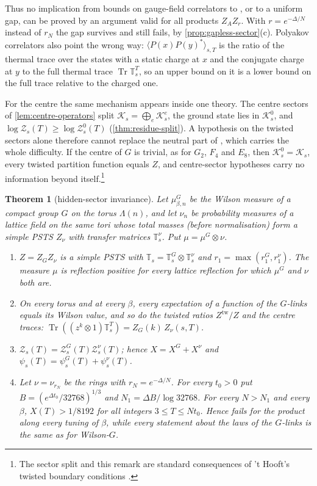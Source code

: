 \documentclass[11pt,a4paper]{amsart}
\newtheorem{theorem}{Theorem}[section]
\theoremstyle{definition}
\theoremstyle{remark}
\numberwithin{equation}{section}
\DeclareMathOperator{\Tr}{Tr}        %
\newcommand{\Kspace}{\mathcal{K}}    %
\newcommand{\PSTS}{\textup{PSTS}}          %
\newcommand{\TT}{\mathbb{T}}               %
\newcommand{\Zc}{\mathcal{Z}}              %
\newcommand{\Zs}[2]{\Zc_{#1}(#2)}          %
\newcommand{\psiT}[2]{\psi_{#1}(#2)}       %
\newcommand{\xconst}{\frac{1}{8192}}       %
\newcommand{\xconstinl}{1/8192}            %
\newcommand{\Mcirc}{\text{\upshape(M$^{\circ}$)}}   %
\newcommand{\Bcirc}{\text{\upshape(B$^{\circ}$)}}   %
\newcommand{\tzero}{t_0}                   %
\begin{document}
Thus no implication from bounds on gauge-field correlators to \Bcirc{}, or to a uniform gap, can be proved by an argument valid for all products $Z_AZ_r$. With $r=e^{-\Delta/N}$ instead of $r_N$ the gap survives and \Bcirc{} still fails, by \cref{prop:gapless-sector}(c). Polyakov correlators also point the wrong way: $\langle P(x)P(y)^*\rangle_{s,T}$ is the ratio of the thermal trace over the states with a static charge at $x$ and the conjugate charge at $y$ to the full thermal trace $\Tr\TT_s^T$, so an upper bound on it is a lower bound on the full trace relative to the charged one.

For the centre the same mechanism appears inside one theory. The centre sectors of \cref{lem:centre-operators} split $\Kspace_s=\bigoplus_e\Kspace^e_s$, the ground state lies in $\Kspace^0_s$, and $\log\Zs{s}{T}\ge\log\Zc^0_s(T)$ (\cref{thm:residue-split}). A hypothesis on the twisted sectors alone therefore cannot replace the neutral part of \Bcirc{}, which carries the whole difficulty. If the centre of $G$ is trivial, as for $G_2$, $F_4$ and $E_8$, then $\Kspace^0_s=\Kspace_s$, every twisted partition function equals $Z$, and centre-sector hypotheses carry no information beyond \Bcirc{} itself.\footnote{The sector split and this remark are standard consequences of 't Hooft's twisted boundary conditions \cite{thooft1979}.}

\begin{theorem}[hidden-sector invariance]\label{thm:hidden-sector}
Let $\mu^G_{\beta,n}$ be the Wilson measure of a compact group $G$ on the torus $\Lambda(n)$, and let $\nu_n$ be probability measures of a lattice field on the same tori whose total masses (before normalisation) form a simple \PSTS{} $Z_\nu$ with transfer matrices $\TT^\nu_s$. Put $\mu=\mu^G\otimes\nu$.
\begin{enumerate}[label=\textup{(\alph*)},leftmargin=*]
\item $Z=Z_GZ_\nu$ is a simple \PSTS{} with $\TT_s=\TT^G_s\otimes\TT^\nu_s$ and $r_1=\max(r^G_1,r^\nu_1)$. The measure $\mu$ is reflection positive for every lattice reflection for which $\mu^G$ and $\nu$ both are.
\item On every torus and at every $\beta$, every expectation of a function of the $G$-links equals its Wilson value, and so do the twisted ratios $Z^{\mathrm{tw}}/Z$ and the centre traces: $\Tr((z^k\otimes1)\TT_s^T)=Z_G(k)\,Z_\nu(s,T)$.
\item $\Zs{s}{T}=\Zc^G_s(T)\Zc^\nu_s(T)$; hence $X=X^G+X^\nu$ and $\psiT{s}{T}=\psi^G_s(T)+\psi^\nu_s(T)$.
\item Let $\nu=\nu_{r_N}$ be the rings with $r_N=e^{-\Delta/N}$. For every $\tzero>0$ put $B=(e^{\Delta\tzero}/32768)^{1/3}$ and $N_1=\Delta B/\log32768$. For every $N>N_1$ and every $\beta$, $X(T)>\xconstinl$ for all integers $3\le T\le N\tzero$. Hence \Mcirc{} fails for the product along every tuning of $\beta$, while every statement about the laws of the $G$-links is the same as for Wilson-$G$.
\end{enumerate}
\end{theorem}
\end{document}
